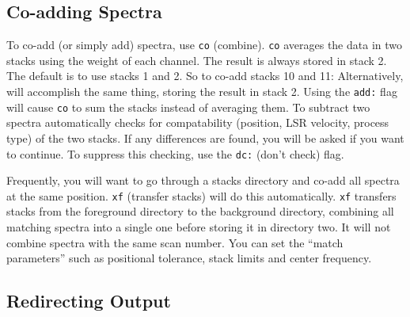 \subsection{Co-adding Spectra}

To co-add (or simply add) spectra, use {\tt co} (combine). {\tt co}
averages the data in two stacks using the weight of each channel.
The result is always stored in stack 2.
The default is to use stacks 1 and 2. So to co-add stacks 10 and 11:
\smallskip
{}
\smallskip
\noindent Alternatively, 
\smallskip
{}
\noindent will accomplish the same thing, storing the result in stack 2.
Using the {\tt add:} flag will cause {\tt co} to sum the stacks instead
of averaging them. To subtract two spectra 
\smallskip
{}
\smallskip
{} automatically checks for compatability (\eg position, LSR velocity, process type) of the two stacks. If any differences are found, you will
be asked if you want to continue. To suppress this checking, use the {\tt dc:}
(don't check) flag.
 
Frequently, you will want to go through a stacks directory and co-add
all spectra at the same position. {\tt xf} (transfer stacks) will do this
automatically. {\tt xf} transfers stacks from the foreground directory to the 
background directory, combining all matching spectra into a single one before
storing it in directory two. It will not combine spectra with the same
scan number. You can set the ``match parameters'' such
as positional tolerance, stack limits and center frequency.
\smallskip
{} 
 
\subsection{Redirecting Output}

